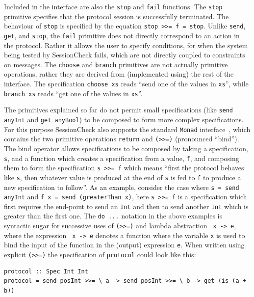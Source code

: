 \documentclass{article}
\begin{document}
Included in the interface are also the \texttt{stop} and \texttt{fail} functions.
%
The \texttt{stop} primitive specifies that the protocol session is successfully terminated.
%
The behaviour of \texttt{stop} is specified by the equation \texttt{stop >>= f = stop}.
%
Unlike \texttt{send}, \texttt{get}, and \texttt{stop},
the \texttt{fail} primitive does not directly correspond to an action in the protocol.
%
Rather it allows the user to specify conditions, for when the system being tested by SessionCheck fails,
which are not directly coupled to constraints on messages.
%
The \texttt{choose} and \texttt{branch} primitives are not actually
primitive operations, rather they are derived from (implemented using)
the rest of the interface.
%
The specification \texttt{choose xs} reads ``send one of the values in \texttt{xs}'',
while \texttt{branch xs} reads ``get one
of the values in \texttt{xs}''.

The primitives explained so far do not permit small specifications
(like \texttt{send anyInt} and \texttt{get anyBool}) to be composed to
form more complex specifications.
%
For this purpose SessionCheck also supports the standard \texttt{Monad} interface~\cite{WadlerMonad}, which contains the
two primitive operations \texttt{return} and \texttt{(>>=)} (pronounced ``bind'').
%
The bind operator allows specifications to be composed by taking a specification, \texttt{s}, and a function which
creates a specification from a value, \texttt{f}, and composing them to form the specification \texttt{s >>= f} which means
``first the protocol behaves like \texttt{s}, then whatever value is produced at the end of \texttt{s} is fed to \texttt{f} to produce
a new specification to follow''.
%
As an example, consider the case where \texttt{s = send anyInt} and \texttt{f x = send (greaterThan x)}, here \texttt{s >>= f} is
a specification which first requires the end-point to send an \texttt{Int} and then to send another \texttt{Int} which is greater
than the first one.
%
The \texttt{do ...} notation in the above examples is syntactic sugar for successive uses of \texttt{(>>=)} and lambda abstraction
\texttt{\ x -> e}, where the expression \texttt{\ x -> e} denotes a function where the variable \texttt{x} is used to bind the input of
the function in the (output) expression \texttt{e}.
%
When written using explicit \texttt{(>>=)} the specification of \texttt{protocol} could look like this:
%
\begin{verbatim}
protocol :: Spec Int Int
protocol = send posInt >>= \ a -> send posInt >>= \ b -> get (is (a + b))
\end{verbatim}
\end{document}
